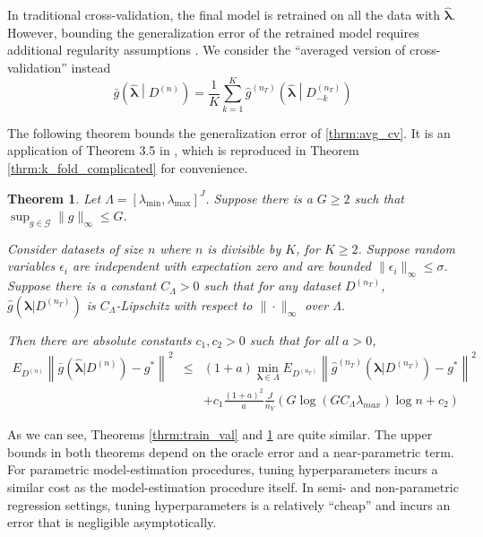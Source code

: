 \documentclass[12pt]{article}
\newtheorem{theorem}{Theorem}
\begin{document}
In traditional cross-validation, the final model is retrained on all the data with $\hat{\boldsymbol{\lambda}}$. However, bounding the generalization error of the retrained model requires additional regularity assumptions \citep{lecue2012oracle}. We consider the ``averaged version of cross-validation'' instead
\begin{equation}
\label{thrm:avg_cv}
\bar{g}\left ( \hat{\boldsymbol \lambda} \middle | {D^{(n)}} \right ) = 
\frac{1}{K} \sum_{k=1}^K 
\hat{g}^{(n_T)} \left (\hat{\boldsymbol \lambda} \middle | D^{(n_T)}_{-k} \right )
\end{equation}

The following theorem bounds the generalization error of \eqref{thrm:avg_cv}. It is an application of Theorem 3.5 in \citet{lecue2012oracle}, which is reproduced in Theorem \ref{thrm:k_fold_complicated} for convenience.

\begin{theorem}
\label{thrm:kfold}
Let $\Lambda = [\lambda_{\min}, \lambda_{\max}]^J$. Suppose there is a $G \ge  2$ such that $\sup_{g \in \mathcal{G}} \|g\|_\infty \le G$.

Consider datasets of size $n$ where $n$ is divisible by $K$, for $K \ge 2$.
Suppose random variables $\epsilon_i$ are independent with expectation zero and are bounded $\| \epsilon_i \|_\infty \le \sigma$. Suppose there is a constant $C_\Lambda >0$ such that for any dataset $D^{(n_T)}$, $\hat g (\boldsymbol{\lambda} | D^{(n_T)})$ is $C_\Lambda$-Lipschitz with respect to $\| \cdot \|_\infty$ over $\Lambda$.

Then there are absolute constants $c_1, c_2 > 0$ such that for all $a > 0$,
\begin{eqnarray}
E_{D^{(n)}} \left \| \bar{g} ( \hat{\boldsymbol \lambda} | {D^{(n)}} ) - g^* \right \|^2 &\le&
(1+a) \min_{\boldsymbol{\lambda} \in \Lambda}  E_{D^{(n_T)}} \left \| \hat{g}^{(n_T)}(\boldsymbol \lambda | D^{(n_T)}) - g^* \right \|^2 \\
&& + c_1 \frac{(1+a)^2}{a} \frac{J}{n_V} 
\left (
G \log (GC_\Lambda \lambda_{max} ) \log n + c_2
\right )
\end{eqnarray}
\end{theorem}

As we can see, Theorems \ref{thrm:train_val} and \ref{thrm:kfold} are quite similar. The upper bounds in both theorems depend on the oracle error and a near-parametric term. For parametric model-estimation procedures, tuning hyperparameters incurs a similar cost as the model-estimation procedure itself. In semi- and non-parametric regression settings, tuning hyperparameters is a relatively ``cheap'' and incurs an error that is negligible asymptotically.
\end{document}
